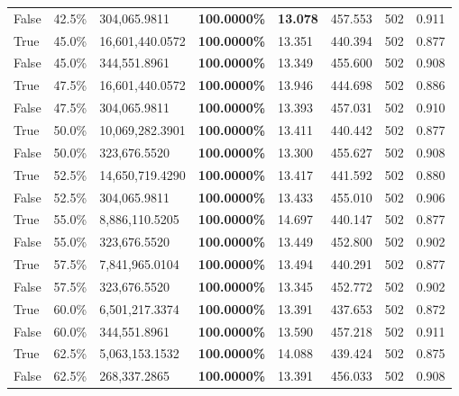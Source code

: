 \begin{table}[H]
{\begin{tabular}{lllrllll}
\cline{1-8}
False & 42.5\% & 304,065.9811 & \bfseries \color{red} 100.0000\% & \bfseries \color{red} 13.078 & 457.553 & 502 & 0.911 \\
\cline{1-8}
True & 45.0\% & 16,601,440.0572 & \bfseries \color{red} 100.0000\% & 13.351 & 440.394 & 502 & 0.877 \\
\cline{1-8}
False & 45.0\% & 344,551.8961 & \bfseries \color{red} 100.0000\% & 13.349 & 455.600 & 502 & 0.908 \\
\cline{1-8}
True & 47.5\% & 16,601,440.0572 & \bfseries \color{red} 100.0000\% & 13.946 & 444.698 & 502 & 0.886 \\
\cline{1-8}
False & 47.5\% & 304,065.9811 & \bfseries \color{red} 100.0000\% & 13.393 & 457.031 & 502 & 0.910 \\
\cline{1-8}
True & 50.0\% & 10,069,282.3901 & \bfseries \color{red} 100.0000\% & 13.411 & 440.442 & 502 & 0.877 \\
\cline{1-8}
False & 50.0\% & 323,676.5520 & \bfseries \color{red} 100.0000\% & 13.300 & 455.627 & 502 & 0.908 \\
\cline{1-8}
True & 52.5\% & 14,650,719.4290 & \bfseries \color{red} 100.0000\% & 13.417 & 441.592 & 502 & 0.880 \\
\cline{1-8}
False & 52.5\% & 304,065.9811 & \bfseries \color{red} 100.0000\% & 13.433 & 455.010 & 502 & 0.906 \\
\cline{1-8}
True & 55.0\% & 8,886,110.5205 & \bfseries \color{red} 100.0000\% & 14.697 & 440.147 & 502 & 0.877 \\
\cline{1-8}
False & 55.0\% & 323,676.5520 & \bfseries \color{red} 100.0000\% & 13.449 & 452.800 & 502 & 0.902 \\
\cline{1-8}
True & 57.5\% & 7,841,965.0104 & \bfseries \color{red} 100.0000\% & 13.494 & 440.291 & 502 & 0.877 \\
\cline{1-8}
False & 57.5\% & 323,676.5520 & \bfseries \color{red} 100.0000\% & 13.345 & 452.772 & 502 & 0.902 \\
\cline{1-8}
True & 60.0\% & 6,501,217.3374 & \bfseries \color{red} 100.0000\% & 13.391 & 437.653 & 502 & 0.872 \\
\cline{1-8}
False & 60.0\% & 344,551.8961 & \bfseries \color{red} 100.0000\% & 13.590 & 457.218 & 502 & 0.911 \\
\cline{1-8}
True & 62.5\% & 5,063,153.1532 & \bfseries \color{red} 100.0000\% & 14.088 & 439.424 & 502 & 0.875 \\
\cline{1-8}
False & 62.5\% & \color{red} 268,337.2865 & \bfseries \color{red} 100.0000\% & 13.391 & 456.033 & 502 & 0.908 \\

\end{tabular}}
\end{table}
